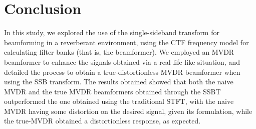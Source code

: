 \section{Conclusion}
\label{sec:conclusion}

In this study, we explored the use of the single-sideband transform for beamforming in a reverberant environment, using the CTF frequency model for calculating filter banks (that is, the beamformer). We employed an MVDR beamformer to enhance the signals obtained via a real-life-like situation, and detailed the process to obtain a true-distortionless MVDR beamformer when using the SSB transform. The results obtained showed that both the naive MVDR and the true MVDR beamformers obtained through the SSBT outperformed the one obtained using the traditional STFT, with the naive MVDR having some distortion on the desired signal, given its formulation, while the true-MVDR obtained a distortionless response, as expected.